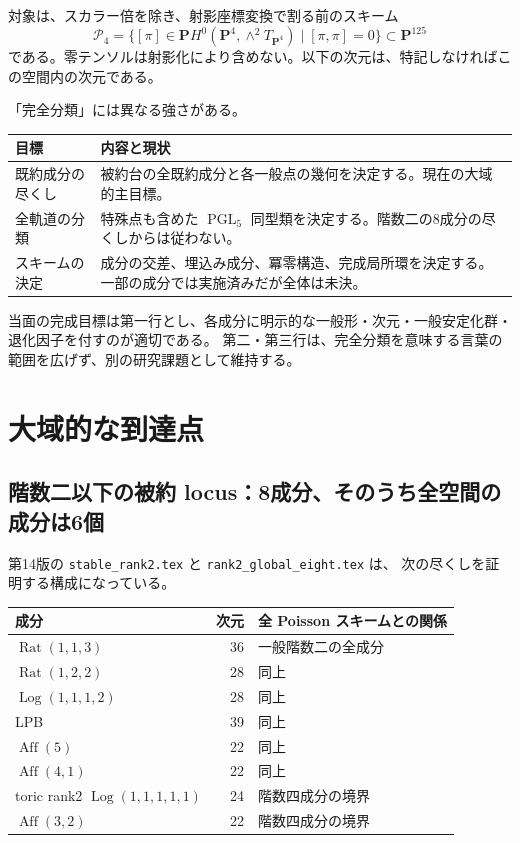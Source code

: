 \documentclass[11pt,a4paper]{ltjsarticle}
\newcommand{\PP}{\mathbf P}\newcommand{\CC}{\mathbf C}\newcommand{\QQ}{\mathbf Q}
\newcommand{\cP}{\mathscr P_4}\newcommand{\OO}{\mathcal O}
\DeclareMathOperator{\PGL}{PGL}\DeclareMathOperator{\GL}{GL}
\DeclareMathOperator{\Rat}{Rat}\DeclareMathOperator{\Aff}{Aff}
\DeclareMathOperator{\Log}{Log}\DeclareMathOperator{\Sec}{Sec}
\theoremstyle{remark}\newtheorem{remark}[proposition]{注意}
\begin{document}
対象は、スカラー倍を除き、射影座標変換で割る前のスキーム
\[
 \cP=\{[\pi]\in\PP H^0(\PP^4,\wedge^2T_{\PP^4})\mid[\pi,\pi]=0\}
 \subset\PP^{125}
\]
である。零テンソルは射影化により含めない。以下の次元は、特記しなければこの空間内の次元である。

「完全分類」には異なる強さがある。
\begin{center}
\begin{tabular}{@{}p{38mm}p{112mm}@{}}\toprule
目標 & 内容と現状\\\midrule
既約成分の尽くし & 被約台の全既約成分と各一般点の幾何を決定する。現在の大域的主目標。\\
全軌道の分類 & 特殊点も含めた $\PGL_5$ 同型類を決定する。階数二の8成分の尽くしからは従わない。\\
スキームの決定 & 成分の交差、埋込み成分、冪零構造、完成局所環を決定する。一部の成分では実施済みだが全体は未決。\\\bottomrule
\end{tabular}
\end{center}

当面の完成目標は第一行とし、各成分に明示的な一般形・次元・一般安定化群・退化因子を付すのが適切である。
第二・第三行は、完全分類を意味する言葉の範囲を広げず、別の研究課題として維持する。

\section{大域的な到達点}

\subsection{階数二以下の被約 locus：8成分、そのうち全空間の成分は6個}

第14版の \texttt{stable\_rank2.tex} と \texttt{rank2\_global\_eight.tex} は、
次の尽くしを証明する構成になっている。
\begin{center}
\begin{tabular}{@{}lrl@{}}\toprule
成分 & 次元 & 全 Poisson スキームとの関係\\\midrule
$\Rat(1,1,3)$ &36& 一般階数二の全成分\\
$\Rat(1,2,2)$ &28& 同上\\
$\Log(1,1,1,2)$ &28& 同上\\
LPB &39& 同上\\
$\Aff(5)$ &22& 同上\\
$\Aff(4,1)$ &22& 同上\\
toric rank2 $\Log(1,1,1,1,1)$ &24& 階数四成分の境界\\
$\Aff(3,2)$ &22& 階数四成分の境界\\\bottomrule
\end{tabular}
\end{center}
\end{document}

